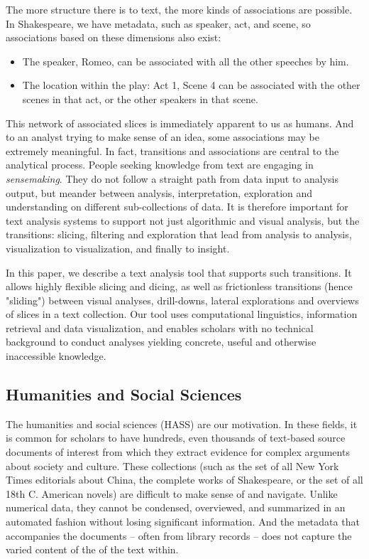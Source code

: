 \documentclass{sig-alternate}
\begin{document}
The more structure there is to text, the more kinds of associations are possible. In Shakespeare, we have metadata, such as speaker, act, and scene, so associations based on these dimensions also exist:
\begin{itemize}
\item The speaker, Romeo, can be associated with all the other speeches by him.
\item The location within the play: Act 1, Scene 4 can be associated with the other scenes in that act, or the other speakers in that scene.
\end{itemize}

This network of associated slices is immediately apparent to us as humans. And to an analyst trying to make sense of an idea, some associations may be extremely meaningful. In fact, transitions  and associations are central to the analytical process. People seeking knowledge from text are engaging in \emph{sensemaking}. They do not follow a straight path from data input to analysis output, but meander between analysis, interpretation, exploration and understanding on different sub-collections of data.  It is therefore important for text analysis systems to support not just algorithmic and visual analysis, but the transitions: slicing, filtering and exploration that lead from analysis to analysis, visualization to visualization, and finally to insight.

In this paper, we describe a text analysis tool that supports such transitions. It allows highly flexible slicing and dicing, as well as frictionless transitions (hence "sliding") between visual analyses, drill-downs, lateral explorations and overviews of slices in a text collection. Our tool uses computational linguistics, information retrieval and data visualization, and enables scholars with no technical background to conduct analyses yielding concrete, useful and otherwise inaccessible knowledge.

\subsection{Humanities and Social Sciences}
The humanities and social sciences (HASS) are our motivation. In these fields, it is common for scholars to have hundreds, even thousands of text-based source documents of interest from which they extract evidence for complex arguments about society and culture. These collections (such as the set of all New York Times editorials about China, the complete works of Shakespeare, or the set of all 18th C. American novels)  are difficult to make sense of and navigate. Unlike numerical data, they cannot be condensed, overviewed, and summarized in an automated fashion without losing significant information. And the metadata that accompanies the documents -- often from library records -- does not capture the varied content of the of the text within.
\end{document}
